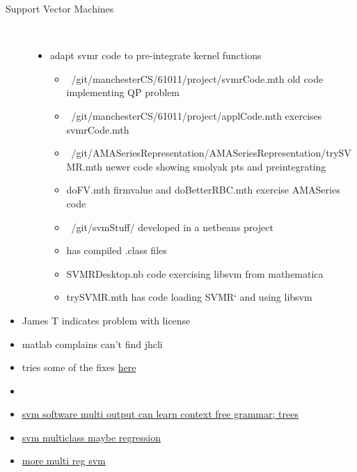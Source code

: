 \documentclass[hyperref]{labbook}
\begin{document}
\begin{description}
\item[Support Vector Machines] \ 
  \begin{itemize}
  \item adapt svmr code to pre-integrate  kernel functions
    \begin{itemize}
    \item ~/git/manchesterCS/61011/project/svmrCode.mth old code implementing QP problem
    \item ~/git/manchesterCS/61011/project/applCode.mth exercises svmrCode.mth
    \item ~/git/AMASeriesRepresentation/AMASeriesRepresentation/trySVMR.mth  newer code showing smolyak pts  and preintegrating
    \item doFV.mth firmvalue and doBetterRBC.mth exercise AMASeries code
    \item ~/git/svmStuff/  developed in a netbeans project
    \item  has compiled .class files
    \item SVMRDesktop.nb code exercising libsvm from mathematica
    \item trySVMR.mth has code loading SVMR` and using libsvm
    \end{itemize}
  \end{itemize}
\end{description}

\begin{itemize}
\item James T indicates problem with license
\item matlab complains can't find jhcli
\item tries some of the fixes \href{https://www.mathworks.com/matlabcentral/answers/102751-how-do-i-configure-the-java-run-time-library-path-java-library-path-in-matlab-with-and-without-adm
}{here }
\item 
\end{itemize}


\begin{itemize}
\item \href{http://www.support-vector-machines.org/SVM_soft.html}{svm software multi output can learn context free grammar; trees}
\item \href{http://www.csie.ntu.edu.tw/~cjlin/bsvm/}{svm multiclass maybe regression}
\item \href{http://people.kyb.tuebingen.mpg.de/spider/}{more multi reg svm}
\end{itemize}
\end{document}
